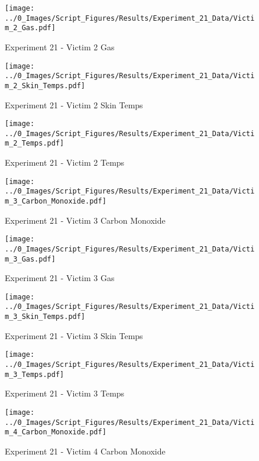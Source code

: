 	\clearpage

	\begin{figure}[H]
		\centering
		\texttt{[image: ../0\_Images/Script\_Figures/Results/Experiment\_21\_Data/Victim\_2\_Gas.pdf]}
		\caption[]{Experiment 21 - Victim 2 Gas}
	\end{figure}
 

	\begin{figure}[H]
		\centering
		\texttt{[image: ../0\_Images/Script\_Figures/Results/Experiment\_21\_Data/Victim\_2\_Skin\_Temps.pdf]}
		\caption[]{Experiment 21 - Victim 2 Skin Temps}
	\end{figure}
 
	\clearpage

	\begin{figure}[H]
		\centering
		\texttt{[image: ../0\_Images/Script\_Figures/Results/Experiment\_21\_Data/Victim\_2\_Temps.pdf]}
		\caption[]{Experiment 21 - Victim 2 Temps}
	\end{figure}
 

	\begin{figure}[H]
		\centering
		\texttt{[image: ../0\_Images/Script\_Figures/Results/Experiment\_21\_Data/Victim\_3\_Carbon\_Monoxide.pdf]}
		\caption[]{Experiment 21 - Victim 3 Carbon Monoxide}
	\end{figure}
 
	\clearpage

	\begin{figure}[H]
		\centering
		\texttt{[image: ../0\_Images/Script\_Figures/Results/Experiment\_21\_Data/Victim\_3\_Gas.pdf]}
		\caption[]{Experiment 21 - Victim 3 Gas}
	\end{figure}
 

	\begin{figure}[H]
		\centering
		\texttt{[image: ../0\_Images/Script\_Figures/Results/Experiment\_21\_Data/Victim\_3\_Skin\_Temps.pdf]}
		\caption[]{Experiment 21 - Victim 3 Skin Temps}
	\end{figure}
 
	\clearpage

	\begin{figure}[H]
		\centering
		\texttt{[image: ../0\_Images/Script\_Figures/Results/Experiment\_21\_Data/Victim\_3\_Temps.pdf]}
		\caption[]{Experiment 21 - Victim 3 Temps}
	\end{figure}
 

	\begin{figure}[H]
		\centering
		\texttt{[image: ../0\_Images/Script\_Figures/Results/Experiment\_21\_Data/Victim\_4\_Carbon\_Monoxide.pdf]}
		\caption[]{Experiment 21 - Victim 4 Carbon Monoxide}
	\end{figure}
 
